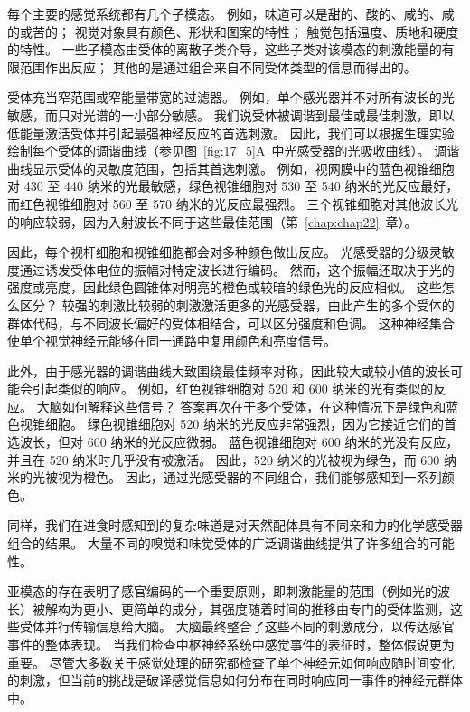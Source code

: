 每个主要的感觉系统都有几个子模态。 
例如，味道可以是甜的、酸的、咸的、咸的或苦的； 
视觉对象具有颜色、形状和图案的特性； 
触觉包括温度、质地和硬度的特性。 
一些子模态由受体的离散子类介导，这些子类对该模态的刺激能量的有限范围作出反应； 
其他的是通过组合来自不同受体类型的信息而得出的。


受体充当窄范围或窄能量带宽的过滤器。 
例如，单个感光器并不对所有波长的光敏感，而只对光谱的一小部分敏感。 
我们说受体被调谐到最佳或最佳刺激，即以低能量激活受体并引起最强神经反应的首选刺激。 
因此，我们可以根据生理实验绘制每个受体的调谐曲线（参见图~\ref{fig:17_5}A~中光感受器的光吸收曲线）。 
调谐曲线显示受体的灵敏度范围，包括其首选刺激。
例如，视网膜中的蓝色视锥细胞对 430 至 440 纳米的光最敏感，绿色视锥细胞对 530 至 540 纳米的光反应最好，而红色视锥细胞对 560 至 570 纳米的光反应最强烈。 
三个视锥细胞对其他波长光的响应较弱，因为入射波长不同于这些最佳范围（第~\ref{chap:chap22}~章）。


因此，每个视杆细胞和视锥细胞都会对多种颜色做出反应。 
光感受器的分级灵敏度通过诱发受体电位的振幅对特定波长进行编码。 
然而，这个振幅还取决于光的强度或亮度，因此绿色圆锥体对明亮的橙色或较暗的绿色光的反应相似。 
这些怎么区分？ 
较强的刺激比较弱的刺激激活更多的光感受器，由此产生的多个受体的群体代码，与不同波长偏好的受体相结合，可以区分强度和色调。 
这种神经集合使单个视觉神经元能够在同一通路中复用颜色和亮度信号。


此外，由于感光器的调谐曲线大致围绕最佳频率对称，因此较大或较小值的波长可能会引起类似的响应。 
例如，红色视锥细胞对 520 和 600 纳米的光有类似的反应。 
大脑如何解释这些信号？ 
答案再次在于多个受体，在这种情况下是绿色和蓝色视锥细胞。 
绿色视锥细胞对 520 纳米的光反应非常强烈，因为它接近它们的首选波长，但对 600 纳米的光反应微弱。 
蓝色视锥细胞对 600 纳米的光没有反应，并且在 520 纳米时几乎没有被激活。 
因此，520 纳米的光被视为绿色，而 600 纳米的光被视为橙色。 
因此，通过光感受器的不同组合，我们能够感知到一系列颜色。


同样，我们在进食时感知到的复杂味道是对天然配体具有不同亲和力的化学感受器组合的结果。 
大量不同的嗅觉和味觉受体的广泛调谐曲线提供了许多组合的可能性。


亚模态的存在表明了感官编码的一个重要原则，即刺激能量的范围（例如光的波长）被解构为更小、更简单的成分，其强度随着时间的推移由专门的受体监测，这些受体并行传输信息给大脑。
大脑最终整合了这些不同的刺激成分，以传达感官事件的整体表现。 
当我们检查中枢神经系统中感觉事件的表征时，整体假说更为重要。 
尽管大多数关于感觉处理的研究都检查了单个神经元如何响应随时间变化的刺激，但当前的挑战是破译感觉信息如何分布在同时响应同一事件的神经元群体中。



